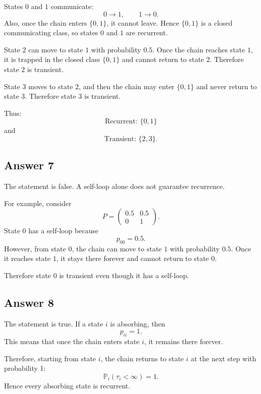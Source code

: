 \documentclass[12pt,a4paper]{article}
\theoremstyle{notestyle}
\newcommand{\Prob}{\mathbb{P}}
\begin{document}
States $0$ and $1$ communicate:
\[
0\to 1,\qquad 1\to 0.
\]
Also, once the chain enters $\{0,1\}$, it cannot leave. Hence $\{0,1\}$ is a closed communicating class, so states $0$ and $1$ are recurrent.

State $2$ can move to state $1$ with probability $0.5$. Once the chain reaches state $1$, it is trapped in the closed class $\{0,1\}$ and cannot return to state $2$. Therefore state $2$ is transient.

State $3$ moves to state $2$, and then the chain may enter $\{0,1\}$ and never return to state $3$. Therefore state $3$ is transient.

Thus:
\[
\boxed{\text{Recurrent: } \{0,1\}}
\]
and
\[
\boxed{\text{Transient: } \{2,3\}.}
\]

\subsection*{Answer 7}

The statement is false. A self-loop alone does not guarantee recurrence.

For example, consider
\[
P=
\begin{pmatrix}
0.5 & 0.5\\
0 & 1
\end{pmatrix}.
\]
State $0$ has a self-loop because
\[
p_{00}=0.5.
\]
However, from state $0$, the chain can move to state $1$ with probability $0.5$. Once it reaches state $1$, it stays there forever and cannot return to state $0$.

Therefore state $0$ is transient even though it has a self-loop.

\subsection*{Answer 8}

The statement is true. If a state $i$ is absorbing, then
\[
p_{ii}=1.
\]
This means that once the chain enters state $i$, it remains there forever.

Therefore, starting from state $i$, the chain returns to state $i$ at the next step with probability 1:
\[
\Prob_i(\tau_i<\infty)=1.
\]
Hence every absorbing state is recurrent.
\end{document}
